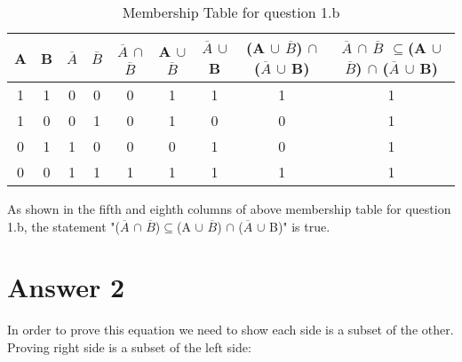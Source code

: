 \documentclass[12pt]{article}
\begin{document}
\begin{table}[H]
\small
\centering
\caption{ Membership Table for question 1.b }

\begin{tabular}{|c|c|c|c|c|c|c|c|c|}	%
\hline 							%
\textbf{A} & \textbf{B} & \textbf{$\overline{A}$} & \textbf{$\overline{B}$} & \textbf{$\overline{A}$ $\cap$ $\overline{B}$} & \textbf{A $\cup$ $\overline{B}$} & \textbf{$\overline{A}$ $\cup$ B} & \textbf{(A $\cup$ $\overline{B}$) $\cap$ ($\overline{A}$ $\cup$ B)} & \textbf{$\overline{A}$ $\cap$ $\overline{B}$ $\subseteq$(A $\cup$ $\overline{B}$) $\cap$ ($\overline{A}$ $\cup$ B)}\\
\hline 
 
1 & 1 & 0 & 0 & 0 & 1 & 1 & 1 & 1 \\ \hline 
1 & 0 & 0 & 1 & 0 & 1 & 0 & 0 & 1 \\ \hline
0 & 1 & 1 & 0 & 0 & 0 & 1 & 0 & 1 \\ \hline
0 & 0 & 1 & 1 & 1 & 1 & 1 & 1 & 1 \\
\hline 

\end{tabular}
\end{table}

As shown in the fifth and eighth columns of above membership table for question 1.b, the statement "($\overline{A}$ $\cap$ $\overline{B}$)$\subseteq$(A $\cup$ $\overline{B}$) $\cap$ ($\overline{A}$ $\cup$ B)" is true.


\section*{Answer 2}
In order to prove this equation we need to show each side is a subset of the other. \\
Proving right side is a subset of the left side:
\end{document}
